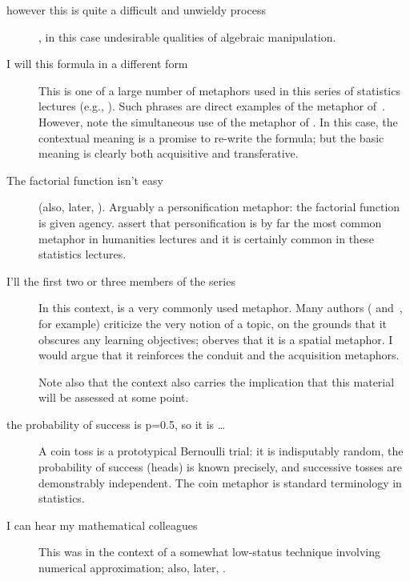 \begin{description}
\item[however this is quite a difficult and unwieldy process]
  , in this case undesirable qualities of
  algebraic manipulation.
\item[I will  this formula in a different form]
  This is one of a large number of  metaphors used in
  this series of statistics lectures (e.g., ).  Such phrases are
  direct examples of the  metaphor
  of~.  However, note the simultaneous use of the
   metaphor of .  In this
  case, the contextual meaning is a promise to re-write the formula;
  but the basic meaning is clearly both acquisitive and transferative.
\item[The factorial function isn't easy ]{(also, later, ).  Arguably a personification metaphor:
  the factorial function is given agency.   assert that
  personification is by far the most common metaphor in humanities
  lectures and it is certainly common in these statistics lectures.}
\item[I'll  the first two or three members of the
  series]{In this context,  is a very commonly used
  metaphor.  Many authors ( and~,
  for example) criticize the very notion of  a topic,
  on the grounds that it obscures any learning objectives;
   oberves that it is a spatial metaphor.  I
  would argue that it reinforces the conduit and the acquisition
  metaphors.

  Note also that the context also carries the implication that this
  material will be assessed at some point.}
\item[the probability of success is p=0.5, so it is \ldots] A coin toss is a prototypical Bernoulli trial: it is
  indisputably random, the probability of success (heads) is known
  precisely, and successive tosses are demonstrably independent.  The
  coin metaphor is standard terminology in statistics.
\item[I can hear my mathematical colleagues ]{This was in the context of a somewhat low-status
  technique involving numerical approximation; also, later,
  .

}
\end{description}
